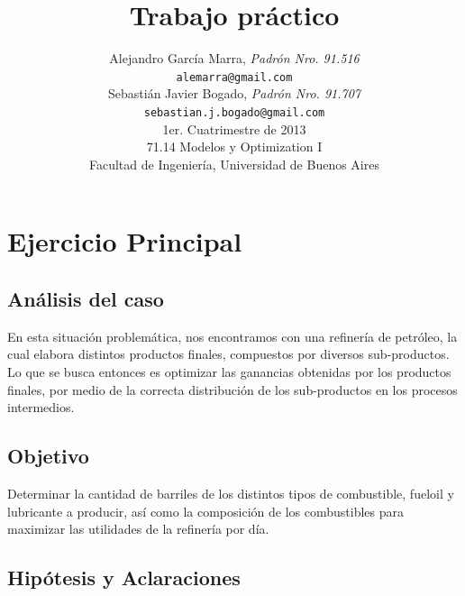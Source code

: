 \documentclass[a4paper,10pt]{article}
\title{		\textbf{Trabajo pr\'actico}}
\author{	Alejandro Garc\'ia Marra, \textit{Padr\'on Nro. 91.516}                     \\
            \texttt{ alemarra@gmail.com }                                              \\
            Sebasti\'an Javier Bogado, \textit{Padr\'on Nro. 91.707}                     \\
            \texttt{ sebastian.j.bogado@gmail.com }                                              \\
            \normalsize{1er. Cuatrimestre de 2013}                       \\
            \normalsize{71.14 Modelos y Optimization I}                             \\
            \normalsize{Facultad de Ingenier\'ia, Universidad de Buenos Aires}            \\
       }
\date{}
\begin{document}
\maketitle

\thispagestyle{empty}


\newpage
\section{Ejercicio Principal}

\subsection{An\'alisis del caso}

En esta situaci\'on problem\'atica, nos encontramos con una refiner\'ia de petr\'oleo, la cual elabora distintos productos finales, compuestos por diversos sub-productos. Lo que se busca entonces es optimizar las ganancias obtenidas por los productos finales, por medio de la correcta distribuci\'on de los sub-productos en los procesos intermedios.

\subsection{Objetivo}
Determinar la cantidad de barriles de los distintos tipos de combustible, fueloil y lubricante a producir, as\'i como la composici\'on de los combustibles para maximizar las utilidades de la refiner\'ia por d\'ia.
\vspace{10mm}

\subsection{Hip\'otesis y Aclaraciones}
\end{document}
